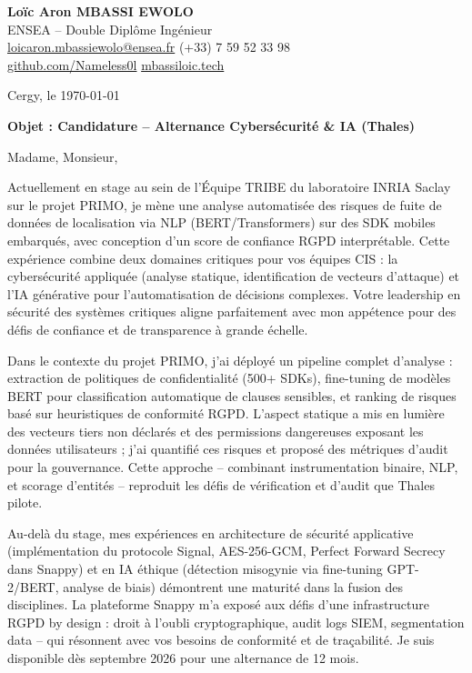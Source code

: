 \documentclass[a4paper,11pt]{article}
\begin{document}
\noindent \textbf{Lo\"ic Aron MBASSI EWOLO} \\
ENSEA -- Double Dipl\^ome Ing\'enieur \\
\href{mailto:loicaron.mbassiewolo@ensea.fr}{loicaron.mbassiewolo@ensea.fr} \quad (+33) 7 59 52 33 98 \\
\href{https://github.com/Nameless0l}{github.com/Nameless0l} \quad \href{https://mbassiloic.tech}{mbassiloic.tech}

\vspace{1em}
\noindent Cergy, le \today

\vspace{1em}
\noindent \textbf{Objet : Candidature -- Alternance Cybersécurité \& IA (Thales)}

\vspace{1.5em}
\noindent Madame, Monsieur,

\vspace{0.8em}
\noindent Actuellement en stage au sein de l'\'Equipe TRIBE du laboratoire INRIA Saclay sur le projet PRIMO, je mène une analyse automatisée des risques de fuite de données de localisation via NLP (BERT/Transformers) sur des SDK mobiles embarqués, avec conception d'un score de confiance RGPD interprétable. Cette expérience combine deux domaines critiques pour vos équipes CIS : la cybersécurité appliquée (analyse statique, identification de vecteurs d'attaque) et l'IA générative pour l'automatisation de décisions complexes. Votre leadership en sécurité des systèmes critiques aligne parfaitement avec mon appétence pour des défis de confiance et de transparence à grande échelle.

\vspace{0.8em}
\noindent Dans le contexte du projet PRIMO, j'ai déployé un pipeline complet d'analyse : extraction de politiques de confidentialité (500+ SDKs), fine-tuning de modèles BERT pour classification automatique de clauses sensibles, et ranking de risques basé sur heuristiques de conformité RGPD. L'aspect statique a mis en lumière des vecteurs tiers non déclarés et des permissions dangereuses exposant les données utilisateurs ; j'ai quantifié ces risques et proposé des métriques d'audit pour la gouvernance. Cette approche -- combinant instrumentation binaire, NLP, et scorage d'entités -- reproduit les défis de vérification et d'audit que Thales pilote.

\vspace{0.8em}
\noindent Au-delà du stage, mes expériences en architecture de sécurité applicative (implémentation du protocole Signal, AES-256-GCM, Perfect Forward Secrecy dans Snappy) et en IA éthique (détection misogynie via fine-tuning GPT-2/BERT, analyse de biais) démontrent une maturité dans la fusion des disciplines. La plateforme Snappy m'a exposé aux défis d'une infrastructure RGPD by design : droit à l'oubli cryptographique, audit logs SIEM, segmentation data -- qui résonnent avec vos besoins de conformité et de traçabilité. Je suis disponible dès septembre 2026 pour une alternance de 12 mois.
\end{document}
